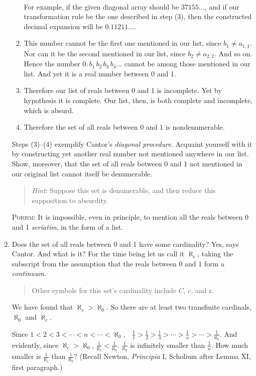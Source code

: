 \documentclass[polutonikogreek,english,twoside,openright]{article}
\begin{document}
\begin{enumerate}
\begin{enumerate}[(1)]
\begin{align*}
  \end{align*}
  For example, if the given diagonal array should be $37155\dotsc$,
  and if our transformation rule be the one described in step (3),
  then the constructed decimal expansion will be $0.11211\dotsc$.
\item This number cannot be the first one mentioned in our list, since
  $b_1\neq a_{1,1}.$ Nor can it be the second mentioned in our list,
  since $b_2\neq a_{2,2}.$ And so on. Hence the number
  $0.\,b_1\,b_2\,b_3\,b_4\dotsc$ cannot be among those mentioned in
  our list. And yet it is a real number between 0 and 1.
\item Therefore our list of reals between 0 and 1 is incomplete. Yet
  by hypothesis it is complete. Our list, then, is both complete and
  incomplete, which is absurd.
\item Therefore the set of all reals between 0 and 1 is
  nondenumerable.
\end{enumerate}
Steps (3)--(4) exemplify Cantor's \emph{diagonal procedure}. Acquaint
yourself with it by constructing yet another real number not mentioned
anywhere in our list. Show, moreover, that the set of all reals
between 0 and 1 not mentioned in our original list cannot itself be
denumerable.
\begin{quote} {\small \emph{Hint}: Suppose this set is denumerable,
    and then reduce this supposition to absurdity.}
\end{quote}
\textsc{Porism}: It is impossible, even in principle, to mention all
the reals between 0 and 1 \emph{seriatim}, in the form of a list.
\item \label{reals}Does the set of all reals between 0 and 1 have some
  cardinality? Yes, says Cantor. And what is it? For the time being
  let us call it $\aleph_{c}$, taking the subscript from the
  assumption that the reals between 0 and 1 form a \emph{continuum}.
  \begin{quote} {\small Other symbols for this set's cardinality
      include $C$, $c$, and $\mathfrak{c}$.}
  \end{quote}
  We have found that $\aleph_{c}>\aleph_{0}$.\label{inequalityalephs}
  So there are at least two transfinite cardinals, $\aleph_{0}$ and
  $\aleph_{c}$.

  Since $1<2<3<\dotsb<n<\dotsb<\aleph_{0}$,\ \
  \label{smallesttransfinite}$\frac{1}{1}>\frac{1}{2}>\frac{1}{3}>\dotsb>\frac{1}{n}>\dotsb>\frac{1}{\aleph_{0}}$.
  And
  evidently, since $\aleph_{c}>\aleph_{0}$,
  $\frac{1}{\aleph_{c}}<\frac{1}{\aleph_{0}}$. $\frac{1}{\aleph_{0}}$
  is infinitely smaller than $\frac{1}{n}$. How much smaller is
  $\frac{1}{\aleph_c}$ than $\frac{1}{\aleph_{0}}$? (Recall Newton,
  \emph{Principia} I, Scholium after Lemma XI, first paragraph.)


\end{enumerate}
\end{document}
